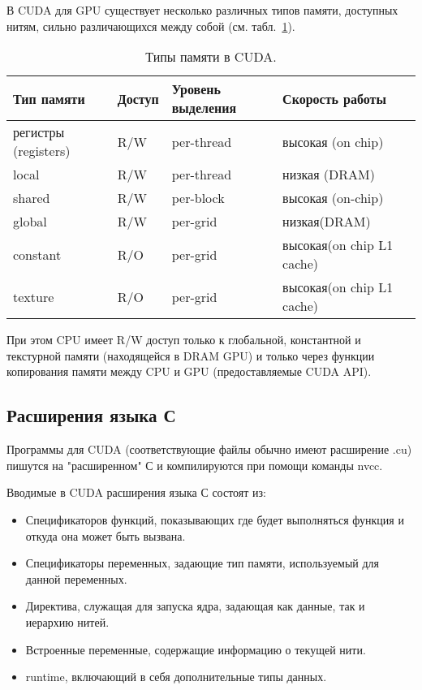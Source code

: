В CUDA для GPU существует несколько различных типов памяти, доступных нитям, сильно различающихся между собой (см. табл.~\ref{cudatypes}).

\begin{table}[h]
\caption{\label{cudatypes}\small{ Типы памяти в CUDA.}}
\begin{center}
\begin{tabular}{|l|l|l|l|}
\hline
Тип памяти	&Доступ	&Уровень выделения 	&Скорость работы \\
\hline
регистры (registers)	&R/W	&per-thread	&высокая (on chip)\\
\hline
local	&R/W	&per-thread	&низкая (DRAM)\\
\hline
shared	&R/W	&per-block	 &высокая (on-chip)\\
\hline
global	&R/W	&per-grid	&низкая(DRAM)\\
\hline
constant	&R/O 	&per-grid	&высокая(on chip L1 cache)\\
\hline
texture	&R/O	 &per-grid	&высокая(on chip L1 cache)\\
\hline
\end{tabular}
\end{center}
\end{table} 
При этом CPU имеет R/W доступ только к глобальной, константной и текстурной памяти (находящейся в DRAM GPU) и только через функции копирования памяти между CPU и GPU (предоставляемые CUDA API).

\subsection{Расширения языка С}

Программы для CUDA (соответствующие файлы обычно имеют расширение .cu) пишутся на "расширенном" С и компилируются при помощи команды nvcc.

Вводимые в CUDA расширения языка С состоят из:
\begin{itemize}
\item Спецификаторов функций, показывающих где будет выполняться функция и откуда она может быть вызвана.
\item Спецификаторы переменных, задающие тип памяти, используемый для данной переменных.
\item Директива, служащая для запуска ядра, задающая как данные, так и иерархию нитей.
\item Встроенные переменные, содержащие информацию о текущей нити.
\item runtime, включающий в себя дополнительные типы данных.
\end{itemize}

